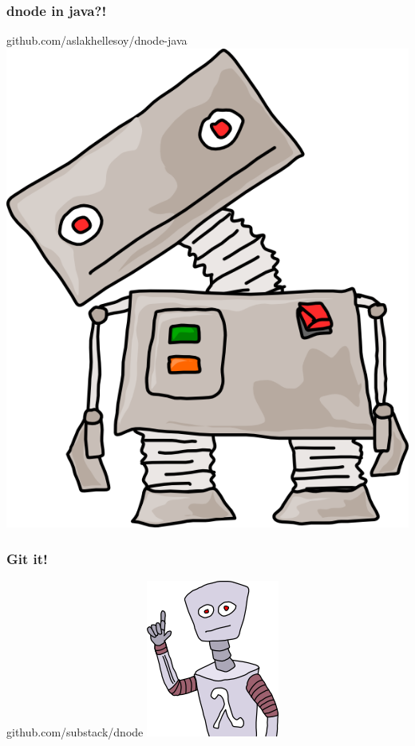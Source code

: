 \documentclass{beamer}
\begin{document}
\begin{frame}
    \frametitle{dnode in java?!}
    \begin{center}
        \huge
        github.com/aslakhellesoy/dnode-java
        \newline
        \includegraphics[scale=0.6]{images/robot_stare.png}
    \end{center}
\end{frame}

\begin{frame}
    \frametitle{Git it!}
    \begin{center}
        \huge
        github.com/substack/dnode
        \newline
        \includegraphics[scale=0.5]{images/robot.png}
    \end{center}
\end{frame}
\end{document}
